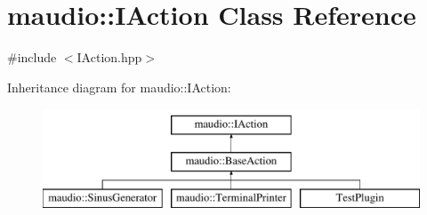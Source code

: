 \hypertarget{classmaudio_1_1IAction}{\section{maudio\-:\-:I\-Action Class Reference}
\label{classmaudio_1_1IAction}
}


{\ttfamily \#include $<$I\-Action.\-hpp$>$}

Inheritance diagram for maudio\-:\-:I\-Action\-:\begin{figure}[H]
\begin{center}
\leavevmode
\includegraphics[height=3.000000cm]{classmaudio_1_1IAction}
\end{center}
\end{figure}
